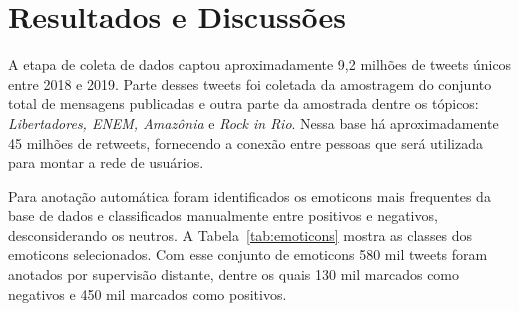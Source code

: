 \chapter{Resultados e Discussões}
\label{chapter:results}


A etapa de coleta de dados captou aproximadamente 9,2 milhões de tweets únicos
entre 2018 e 2019.
Parte desses tweets foi coletada da amostragem do conjunto total de mensagens
publicadas e outra parte da amostrada dentre os tópicos: \textit{Libertadores,
ENEM, Amazônia} e \textit{Rock in Rio}.
Nessa base há aproximadamente 45 milhões de retweets, fornecendo a conexão entre
pessoas que será utilizada para montar a rede de usuários.

Para anotação automática foram identificados os emoticons mais frequentes da
base de dados e classificados manualmente entre positivos e negativos,
desconsiderando os neutros.
A Tabela~\ref{tab:emoticons} mostra as classes dos emoticons selecionados.
Com esse conjunto de emoticons 580 mil tweets foram anotados por supervisão
distante, dentre os quais 130 mil marcados como negativos e 450 mil marcados como
positivos.

